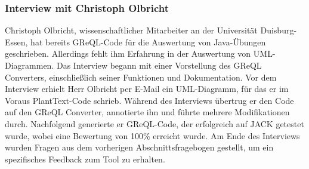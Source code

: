 \subsubsection{Interview mit Christoph Olbricht}
Christoph Olbricht, wissenschaftlicher Mitarbeiter an der Universität Duisburg-Essen, hat bereits GReQL-Code für die
Auswertung von Java-Übungen geschrieben. Allerdings fehlt ihm Erfahrung in der Auswertung von UML-Diagrammen. Das
Interview begann mit einer Vorstellung des GReQL Converters, einschließlich seiner Funktionen und Dokumentation. Vor
dem Interview erhielt Herr Olbricht per E-Mail ein UML-Diagramm, für das er im Voraus PlantText-Code schrieb. Während
des Interviews übertrug er den Code auf den GReQL Converter, annotierte ihn und führte mehrere Modifikationen durch.
Nachfolgend generierte er GReQL-Code, der erfolgreich auf JACK getestet wurde, wobei eine Bewertung von 100\% erreicht
wurde. Am Ende des Interviews wurden Fragen aus dem vorherigen Abschnittsfragebogen gestellt, um ein spezifisches
Feedback zum Tool zu erhalten.

